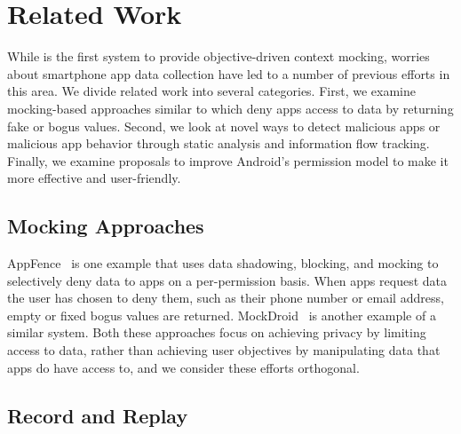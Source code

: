 \section{Related Work}
\label{sec-related}

While \PocketMocker{} is the first system to provide objective-driven context
mocking, worries about smartphone app data collection have led to a number of
previous efforts in this area. We divide related work into several
categories. First, we examine mocking-based approaches similar to
\PocketMocker{} which deny apps access to data by returning fake or bogus
values. Second, we look at novel ways to detect malicious apps or malicious
app behavior through static analysis and information flow tracking. Finally,
we examine proposals to improve Android's permission model to make it more
effective and user-friendly.



\subsection{Mocking Approaches}

AppFence~\cite{droids-ccs11} is one example that uses data shadowing,
blocking, and mocking to selectively deny data to apps on a per-permission
basis. When apps request data the user has chosen to deny them, such as their
phone number or email address, empty or fixed bogus values are returned.
MockDroid~\cite{mockdroid-hotmobile11} is another example of a similar
system. Both these approaches focus on achieving privacy by limiting access
to data, rather than achieving user objectives by manipulating data that apps
do have access to, and we consider these efforts orthogonal.


\subsection{Record and Replay}

